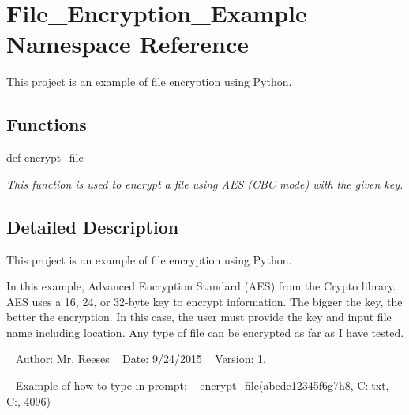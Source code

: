 \hypertarget{namespace_file___encryption___example}{}\section{File\+\_\+\+Encryption\+\_\+\+Example Namespace Reference}
\label{namespace_file___encryption___example}


This project is an example of file encryption using Python.  


\subsection*{Functions}
\begin{DoxyCompactItemize}
\item 
def \hyperlink{namespace_file___encryption___example_a2f6533da101e38d3c94dbac35ed74ba3}{encrypt\+\_\+file}
\begin{DoxyCompactList}\small\item\em This function is used to encrypt a file using A\+E\+S (C\+B\+C mode) with the given key. \end{DoxyCompactList}\end{DoxyCompactItemize}


\subsection{Detailed Description}
This project is an example of file encryption using Python. 

In this example, Advanced Encryption Standard (A\+E\+S) from the Crypto library. A\+E\+S uses a 16, 24, or 32-\/byte key to encrypt information. The bigger the key, the better the encryption. In this case, the user must provide the key and input file name including location. Any type of file can be encrypted as far as I have tested.

~\newline
 Author\+: Mr. Reeses ~\newline
 Date\+: 9/24/2015 ~\newline
 Version\+: 1.

~\newline
 Example of how to type in prompt\+: ~\newline
 encrypt\+\_\+file(\textquotesingle{}abcde12345f6g7h8\textquotesingle{}, \textquotesingle{}C\+:.txt\textquotesingle{}, \textquotesingle{}C\+:\textquotesingle{}, 4096) 

